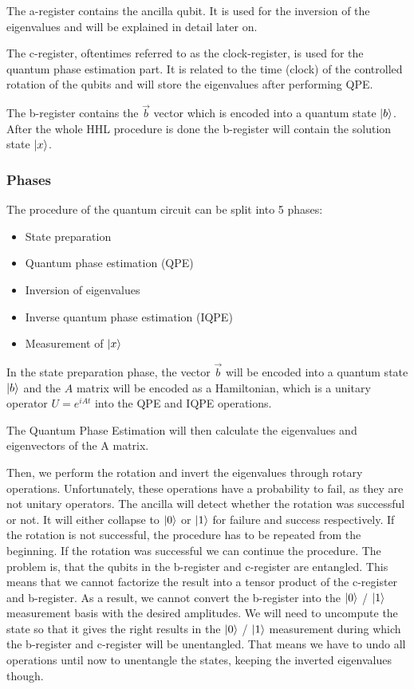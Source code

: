 The a-register contains the ancilla qubit. 
It is used for the inversion of the eigenvalues and will be explained in detail later on.

The c-register, oftentimes referred to as the clock-register, is used for the quantum phase estimation part. It is related to the time (clock) of the controlled rotation of the qubits and will store the eigenvalues after performing QPE.

The b-register contains the $\vec{b}$ vector which is encoded into a quantum state $\ket{b}$. 
After the whole HHL procedure is done the b-register will contain the solution state $\ket{x}$.



\subsubsection{Phases}
The procedure of the quantum circuit can be split into 5 phases:

\begin{itemize}
\item State preparation
\item Quantum phase estimation (QPE)
\item Inversion of eigenvalues
\item Inverse quantum phase estimation (IQPE)
\item Measurement of $\ket x$
\end{itemize}

In the state preparation phase, the vector $\vec{b}$ will be encoded into a quantum state $\ket{b}$ and the $A$ matrix will be encoded as a Hamiltonian, which is a unitary operator
$U=e^{iAt}$ into the QPE and IQPE operations.

The Quantum Phase Estimation will then calculate the eigenvalues and eigenvectors of the A matrix.

Then, we perform the rotation and invert the eigenvalues through rotary operations. 
Unfortunately, these operations have a probability to fail, as they are not unitary operators.
The ancilla will detect whether the rotation was successful or not.
It will either collapse to $\ket0$ or $\ket1$ for failure and success respectively.
If the rotation is not successful, the procedure has to be repeated from the beginning. 
If the rotation was successful we can continue the procedure. 
The problem is, that the qubits in the b-register and c-register are entangled. 
This means that we cannot factorize the result into a tensor product of the c-register and b-register.
As a result, we cannot convert the b-register into the $\ket 0$ / $\ket 1$ measurement basis with the desired amplitudes.
We will need to uncompute the state so that it gives the right results in the $\ket 0$ / $\ket 1$ measurement during which the b-register and c-register will be unentangled.
That means we have to undo all operations until now to unentangle the states, keeping the inverted eigenvalues though.

